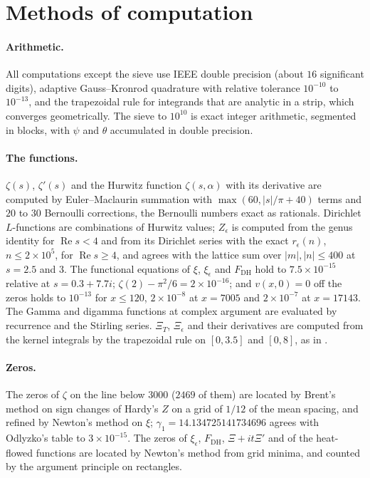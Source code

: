 \documentclass[11pt]{article}
\theoremstyle{definition}\newtheorem{definition}[theorem]{Definition}
\theoremstyle{remark}\newtheorem{remark}[theorem]{Remark}
\renewcommand{\Re}{\operatorname{Re}}\renewcommand{\Im}{\operatorname{Im}}
\begin{document}
\section{Methods of computation}\label{sec:methods}

\paragraph{Arithmetic.} All computations except the sieve use IEEE double precision (about $16$ significant digits), adaptive Gauss--Kronrod quadrature with relative tolerance $10^{-10}$ to $10^{-13}$, and the trapezoidal rule for integrands that are analytic in a strip, which converges geometrically. The sieve to $10^{10}$ is exact integer arithmetic, segmented in blocks, with $\psi$ and $\theta$ accumulated in double precision.

\paragraph{The functions.} $\zeta(s)$, $\zeta'(s)$ and the Hurwitz function $\zeta(s,\alpha)$ with its derivative are computed by Euler--Maclaurin summation with $\max(60,|s|/\pi+40)$ terms and $20$ to $30$ Bernoulli corrections, the Bernoulli numbers exact as rationals. Dirichlet $L$-functions are combinations of Hurwitz values; $Z_\epsilon$ is computed from the genus identity for $\Re s<4$ and from its Dirichlet series with the exact $r_\epsilon(n)$, $n\le2\times10^5$, for $\Re s\ge4$, and agrees with the lattice sum over $|m|,|n|\le400$ at $s=2.5$ and $3$. The functional equations of $\xi$, $\xi_\epsilon$ and $F_{\mathrm{DH}}$ hold to $7.5\times10^{-15}$ relative at $s=0.3+7.7i$; $\zeta(2)-\pi^2/6=2\times10^{-16}$; and $v(x,0)=0$ off the zeros holds to $10^{-13}$ for $x\le120$, $2\times10^{-8}$ at $x=7005$ and $2\times10^{-7}$ at $x=17143$. The Gamma and digamma functions at complex argument are evaluated by recurrence and the Stirling series. $\Xi_T$, $\Xi_\epsilon$ and their derivatives are computed from the kernel integrals by the trapezoidal rule on $[0,3.5]$ and $[0,8]$, as in \cite{S01}.

\paragraph{Zeros.} The zeros of $\zeta$ on the line below $3000$ ($2469$ of them) are located by Brent's method on sign changes of Hardy's $Z$ on a grid of $1/12$ of the mean spacing, and refined by Newton's method on $\xi$; $\gamma_1=14.134725141734696$ agrees with Odlyzko's table \cite{Odlyzko} to $3\times10^{-15}$. The zeros of $\xi_\epsilon$, $F_{\mathrm{DH}}$, $\Xi+it\Xi'$ and of the heat-flowed functions are located by Newton's method from grid minima, and counted by the argument principle on rectangles.
\end{document}
